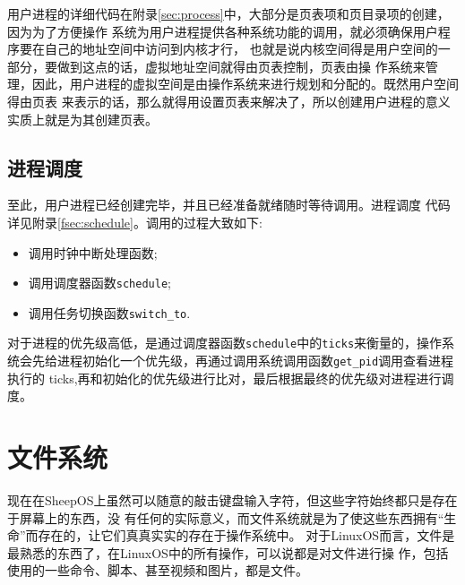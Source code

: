 用户进程的详细代码在附录\ref{sec:process}中，大部分是页表项和页目录项的创建，因为为了方便操作
系统为用户进程提供各种系统功能的调用，就必须确保用户程序要在自己的地址空间中访问到内核才行，
也就是说内核空间得是用户空间的一部分，要做到这点的话，虚拟地址空间就得由页表控制，页表由操
作系统来管理，因此，用户进程的虚拟空间是由操作系统来进行规划和分配的。既然用户空间得由页表
来表示的话，那么就得用设置页表来解决了，所以创建用户进程的意义实质上就是为其创建页表。

\subsection{进程调度}
至此，用户进程已经创建完毕，并且已经准备就绪随时等待调用。进程调度
代码详见附录\ref{fsec:schedule}。调用的过程大致如下:
\begin{itemize}
\item 调用时钟中断处理函数;
\item 调用调度器函数\texttt{schedule};
\item 调用任务切换函数\texttt{switch\_to}.
\end{itemize}
对于进程的优先级高低，是通过调度器函数\texttt{schedule}中的\texttt{ticks}来衡量的，操作系
统会先给进程初始化一个优先级，再通过调用系统调用函数\texttt{get\_pid}调用查看进程执行的
ticks,再和初始化的优先级进行比对，最后根据最终的优先级对进程进行调度。

\section{文件系统}
\label{sec:file}

现在在SheepOS上虽然可以随意的敲击键盘输入字符，但这些字符始终都只是存在于屏幕上的东西，没
有任何的实际意义，而文件系统就是为了使这些东西拥有“生命”而存在的，让它们真真实实的存在于操作系统中。
对于LinuxOS而言，文件是最熟悉的东西了，在LinuxOS中的所有操作，可以说都是对文件进行操
作，包括使用的一些命令、脚本、甚至视频和图片，都是文件。

